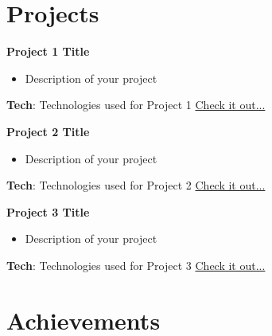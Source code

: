 \documentclass[a4paper,11pt]{article}
\newcommand{\resumeItemListStart}{\begin{itemize}[label={$\bullet$}, leftmargin=*]}
\newcommand{\resumeItemListEnd}{\end{itemize}\vspace{-5pt}}
\begin{document}
\section{\textbf{{\LARGE Projects}}}
\begin{description}[font=$\bullet$]

  \item{\textbf{Project 1 Title}}
  \resumeItemListStart
    \item Description of your project
  \resumeItemListEnd
  \textbf{Tech}: Technologies used for Project 1
  \hfill \textcolor{blue}{\href{https://project1-link}{Check it out...}}

  \item{\textbf{Project 2 Title}}
  \resumeItemListStart
    \item Description of your project
  \resumeItemListEnd
  \textbf{Tech}: Technologies used for Project 2
  \hfill \textcolor{blue}{\href{https://project2-link}{Check it out...}}

  \item{\textbf{Project 3 Title}}
  \resumeItemListStart
    \item Description of your project
  \resumeItemListEnd
  \textbf{Tech}: Technologies used for Project 3
  \hfill \textcolor{blue}{\href{https://project3-link}{Check it out...}}
\end{description}


\section{\textbf{{\LARGE Achievements}}}
\end{document}

